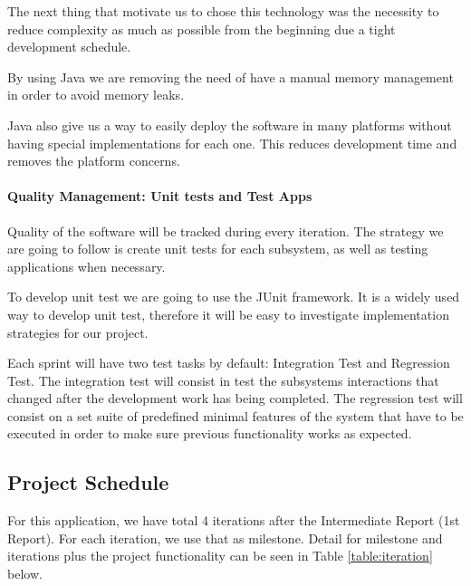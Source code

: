 \documentclass[11pt]{article}
\begin{document}
	The next thing that motivate us to chose this technology was the necessity to reduce complexity as much as possible from the beginning due a tight development schedule. 
	
	By using Java we are removing the need of have a manual memory management in order to avoid memory leaks.
	
	Java also give us a way to easily deploy the software in many platforms without having special implementations for each one. This reduces development time and removes the platform concerns.
	
	\paragraph{Quality Management: Unit tests and Test Apps} Quality of the software will be tracked during every iteration. The strategy we are going to follow is create unit tests for each subsystem, as well as testing applications when necessary.  
	
	To develop unit test we are going to use the JUnit framework. It is a widely used way to develop unit test, therefore it will be easy to investigate implementation strategies for our project. 
	
	Each sprint will have two test tasks by default: Integration Test and Regression Test. The integration test will consist in test the subsystems interactions that changed after the development work has being completed. The regression test will consist on a set suite of predefined minimal features of the system that have to be executed in order to make sure previous functionality works as expected.
	
\subsection{Project Schedule}

 For this application, we have total 4 iterations after the Intermediate Report (1st Report). For each iteration, we use that as milestone. Detail for milestone and iterations plus the project functionality can be seen in Table \ref{table:iteration} below.
\end{document}

